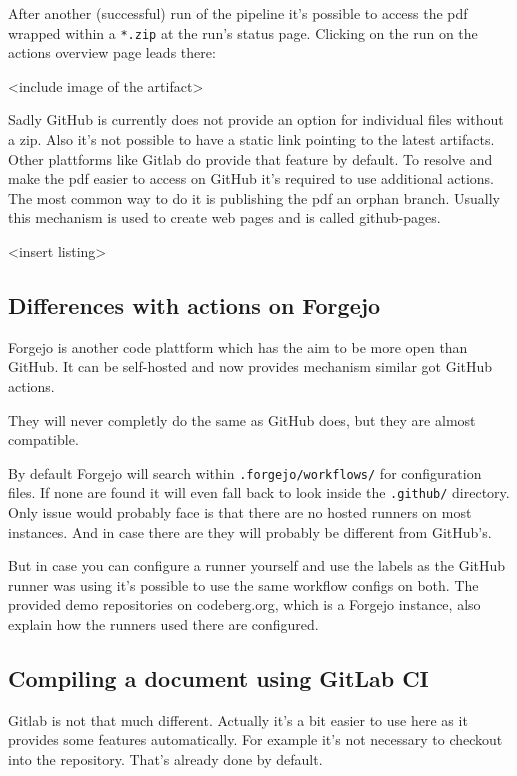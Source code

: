 \documentclass[final]{ltugboat}
\newcommand*{\file}[1]{\texttt{#1}}
\newcommand*{\directory}[1]{\texttt{#1}}
\begin{document}
\inputminted[firstline=13, lastline=17,gobble=3]{yaml}{examples/latex-basic.yml}

After another (successful) run of the pipeline it's possible to access the pdf wrapped within a  \file{*.zip} at the run's status page.
Clicking on the run on the actions overview page leads there:

<include image of the artifact>

Sadly GitHub is currently does not provide an option for individual files without a zip.
Also it's not possible to have a static link pointing to the latest artifacts.
Other plattforms like Gitlab do provide that feature by default.
To resolve and make the pdf easier to access on GitHub it's required to use additional actions.
The most common way to do it is publishing the pdf an orphan branch.
Usually this mechanism is used to create web pages and is called github-pages.

<insert listing>

\subsection{Differences with actions on Forgejo}
Forgejo\cite{forgejo} is another code plattform which has the aim to be more open than GitHub.
It can be self-hosted and now provides mechanism similar got GitHub actions.

They will never completly do the same as GitHub does, but they are almost compatible.

By default Forgejo will search within \directory{.forgejo/workflows/} for configuration files.
If none are found it will even fall back to look inside the \directory{.github/} directory.
Only issue would probably face is that there are no hosted runners on most instances.
And in case there are they will probably be different from GitHub's.

But in case you can configure a runner yourself and use the labels as the GitHub runner \cite[described in]{forgejo-runner-config} was using it's possible to use the same workflow configs on both.
The provided demo repositories on codeberg.org, which is a Forgejo instance, also explain how the runners used there are configured.

\subsection{Compiling a document using GitLab CI}

Gitlab is not that much different. Actually it's a bit easier to use here as it provides some features automatically.
For example it's not necessary to checkout into the repository.
That's already done by default.
\end{document}
